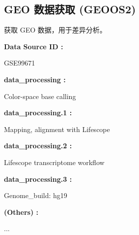 \documentclass[
]{article}
\begin{document}
\begin{center}\vspace{1.5cm}\end{center}

\hypertarget{geo-ux6570ux636eux83b7ux53d6-geoos2}{%
\subsection{GEO 数据获取 (GEOOS2)}\label{geo-ux6570ux636eux83b7ux53d6-geoos2}}

获取 GEO 数据，用于差异分析。

\begin{center}\begin{tcolorbox}[colback=gray!10, colframe=gray!50, width=0.9\linewidth, arc=1mm, boxrule=0.5pt]
\textbf{
Data Source ID
:}

\vspace{0.5em}

    GSE99671

\vspace{2em}


\textbf{
data\_processing
:}

\vspace{0.5em}

    Color-space base calling

\vspace{2em}


\textbf{
data\_processing.1
:}

\vspace{0.5em}

    Mapping, alignment with Lifescope

\vspace{2em}


\textbf{
data\_processing.2
:}

\vspace{0.5em}

    Lifescope transcriptome workflow

\vspace{2em}


\textbf{
data\_processing.3
:}

\vspace{0.5em}

    Genome\_build: hg19

\vspace{2em}


\textbf{
(Others)
:}

\vspace{0.5em}

    ...

\vspace{2em}
\end{tcolorbox}
\end{center}
\end{document}
